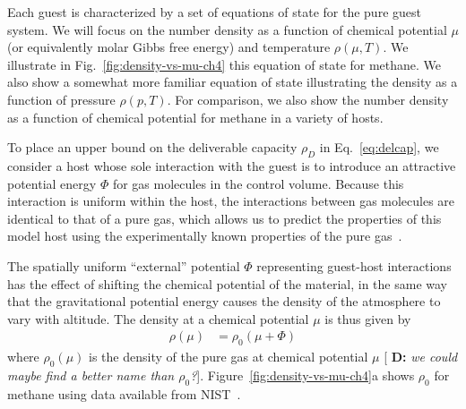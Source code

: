\documentclass{nature}
\newcommand\V{\Phi}
\newcommand{\blue}[1]{{\bf \color{blue} #1}}
\newcommand{\davidsays}[1]{{\color{red} [\blue{D:} \emph{#1}]}}
\begin{document}
Each guest is characterized by a set of equations of state for the pure guest system.  We will focus on the number density as a function of chemical potential $\mu$ (or equivalently molar Gibbs free energy) and temperature $\rho(\mu,T)$.  We illustrate in Fig.~\ref{fig:density-vs-mu-ch4} this equation of state for methane. We also show a somewhat more familiar equation of state illustrating the density as a function of pressure $\rho(p,T)$.  For comparison, we also show the number density as a function of chemical potential for methane in a variety of hosts.


To place an upper bound on the deliverable capacity $\rho_D$ in Eq.~\ref{eq:delcap}, we consider a host whose sole interaction with the guest is to introduce an attractive potential energy $\V$ for gas molecules in the control volume.  Because this interaction is uniform within the host, the interactions between gas molecules are identical to that of a pure gas, which allows us to predict the properties of this model host using the experimentally known properties of the pure gas~\cite{nist}.


The spatially uniform ``external'' potential $\V$ representing guest-host interactions has the effect of shifting the chemical potential of the material, in the same way that the gravitational potential energy causes the density of the atmosphere to vary with altitude.  The density at a chemical potential $\mu$ is thus given by
\begin{align}
    \rho(\mu) &= \rho_0(\mu + \V)\label{eq:mof-density}
\end{align}
where $\rho_0(\mu)$ is the density of the pure gas at chemical potential $\mu$ \davidsays{we could maybe find a better name than $\rho_0$?}.  Figure~\ref{fig:density-vs-mu-ch4}a shows $\rho_0$ for methane using data available from NIST~\cite{nist}.
\end{document}
